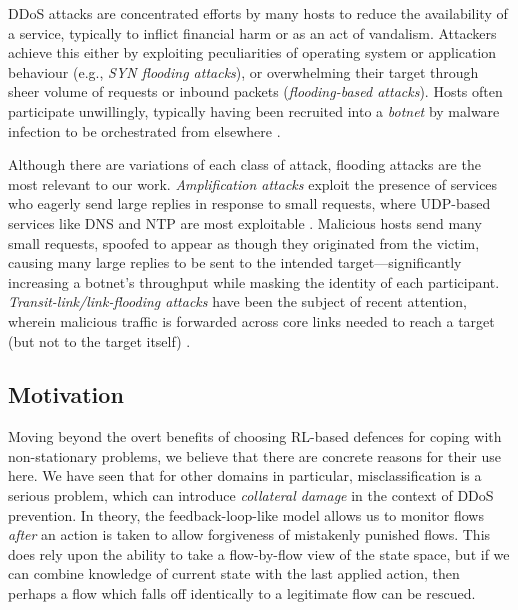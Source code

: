 \documentclass[conference, letterpaper, 10pt, times]{IEEEtran}
\begin{document}

DDoS attacks are concentrated efforts by many hosts to reduce the availability of a service, typically to inflict financial harm or as an act of vandalism.
Attackers achieve this either by exploiting peculiarities of operating system or application behaviour (e.g., \emph{SYN flooding attacks}), or overwhelming their target through sheer volume of requests or inbound packets (\emph{flooding-based attacks}).
Hosts often participate unwillingly, typically having been recruited into a \emph{botnet} by malware infection to be orchestrated from elsewhere \cite{DBLP:conf/uss/AntonakakisABBB17}.

Although there are variations of each class of attack, flooding attacks are the most relevant to our work.
\emph{Amplification attacks} exploit the presence of services who eagerly send large replies in response to small requests, where UDP-based services like DNS and NTP are most exploitable \cite{DBLP:conf/ndss/Rossow14, DBLP:conf/uss/KuhrerHRH14}.
Malicious hosts send many small requests, spoofed to appear as though they originated from the victim, causing many large replies to be sent to the intended target---significantly increasing a botnet's throughput while masking the identity of each participant.
\emph{Transit-link/link-flooding attacks} have been the subject of recent attention, wherein malicious traffic is forwarded across core links needed to reach a target (but not to the target itself) \cite{DBLP:conf/sp/KangLG13, DBLP:conf/esorics/StuderP09}.

\subsection{Motivation}\label{sec:motivation}
Moving beyond the overt benefits of choosing RL-based defences for coping with non-stationary problems, we believe that there are concrete reasons for their use here.
We have seen that for other domains in particular, misclassification is a serious problem, which can introduce \emph{collateral damage} in the context of DDoS prevention.
In theory, the feedback-loop-like model allows us to monitor flows \emph{after} an action is taken to allow forgiveness of mistakenly punished flows.
This does rely upon the ability to take a flow-by-flow view of the state space, but if we can combine knowledge of current state with the last applied action, then perhaps a flow which falls off identically to a legitimate flow can be rescued.
\end{document}
